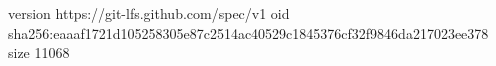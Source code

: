 version https://git-lfs.github.com/spec/v1
oid sha256:eaaaf1721d105258305e87c2514ac40529c1845376cf32f9846da217023ee378
size 11068
